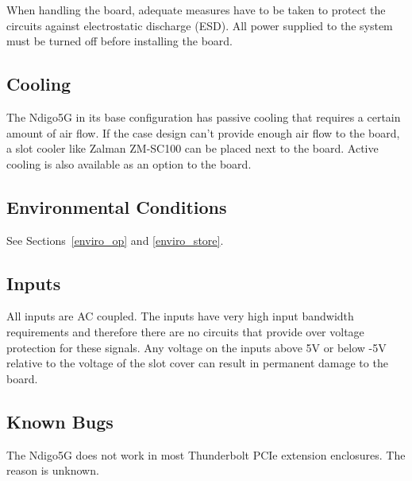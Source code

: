 	When handling the board, adequate measures have to be taken to protect the circuits against electrostatic discharge (ESD). All power supplied to the system must be turned off before installing the board.

\subsection{Cooling}

	The Ndigo5G in its base configuration has passive cooling that requires a certain amount of air flow. If the case design can't provide enough air flow to the board, a slot cooler like Zalman ZM-SC100 can be placed next to the board. Active cooling is also available as an option to the board.

\subsection{Environmental Conditions}
	See Sections~\ref{enviro_op} and \ref{enviro_store}.

\subsection{Inputs}

	All inputs are AC coupled. The inputs have very high input bandwidth requirements and therefore there are no circuits that provide over voltage protection for these signals. Any voltage on the inputs above 5V or below -5V relative to the voltage of the slot cover can result in permanent damage to the board.

\subsection{Known Bugs}

	The Ndigo5G does not work in most Thunderbolt PCIe extension enclosures. The reason is unknown. 

